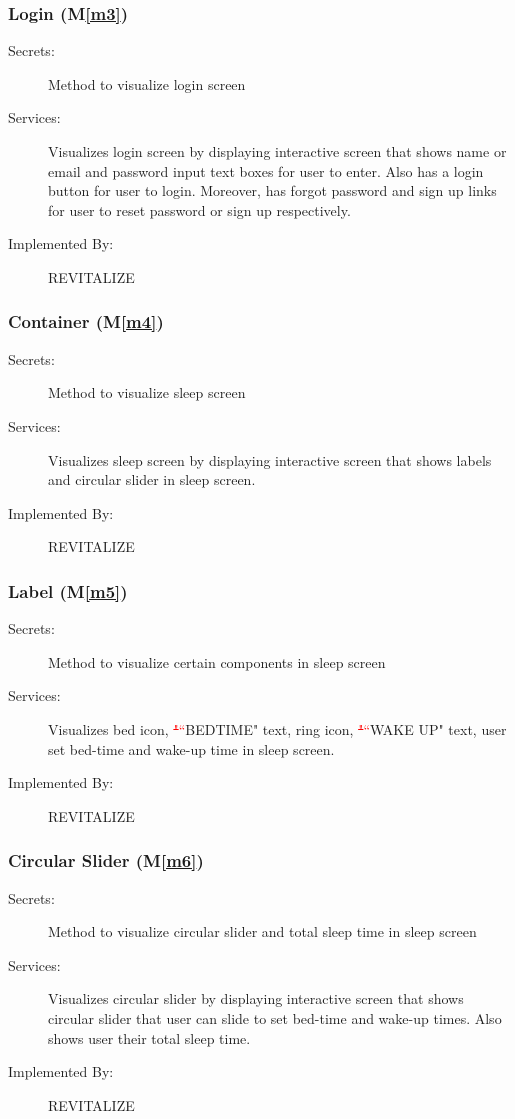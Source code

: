 \documentclass[12pt, titlepage]{article}
\newcommand{\mref}[1]{M\ref{#1}}
\begin{document}
\subsubsection{Login (\mref{m3})}
\begin{description}
	\item[Secrets:]Method to visualize login screen
	\item[Services:]Visualizes login screen by displaying interactive screen that shows name or email and password input text boxes for user to enter. Also has a login button for user to login. Moreover, has forgot password and sign up links for user to reset password or sign up respectively.
	\item[Implemented By:] REVITALIZE
\end{description}

\subsubsection{Container (\mref{m4})}
\begin{description}
	\item[Secrets:]Method to visualize sleep screen
	\item[Services:]Visualizes sleep screen by displaying interactive screen that shows labels and circular slider in sleep screen.
	\item[Implemented By:] REVITALIZE
\end{description}

\subsubsection{Label (\mref{m5})}
\begin{description}
	\item[Secrets:]Method to visualize certain components in sleep screen
	\item[Services:]Visualizes bed icon, \textcolor{red}{\sout{"}}\textcolor{red}{``}BEDTIME" text, ring icon, \textcolor{red}{\sout{"}}\textcolor{red}{``}WAKE UP" text, user set bed-time and wake-up time in sleep screen.
	\item[Implemented By:] REVITALIZE
\end{description}

\subsubsection{Circular Slider (\mref{m6})}
\begin{description}
	\item[Secrets:]Method to visualize circular slider and total sleep time in sleep screen
	\item[Services:]Visualizes circular slider by displaying interactive screen that shows circular slider that user can slide to set bed-time and wake-up times. Also shows user their total sleep time.
	\item[Implemented By:] REVITALIZE
\end{description}
\end{document}
